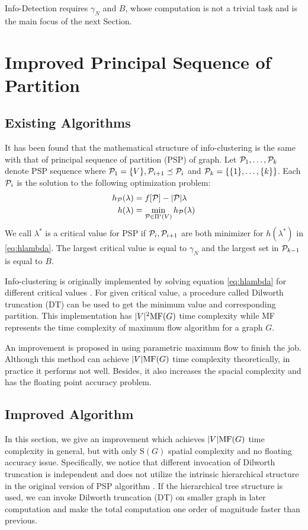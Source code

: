 \documentclass[runningheads]{llncs}
\begin{document}
Info-Detection requires $\gamma_N$ and $B$, whose computation is not a trivial task and is the main focus of the next Section.

\section{Improved Principal Sequence of Partition}\label{sec:Alg}
\subsection{Existing Algorithms}
It has been found that the mathematical structure of info-clustering is the same with that of principal sequence of partition (PSP) of graph. Let $\P_1, \dots, \P_k$ denote PSP sequence where $\P_1 = \{V\}, \P_{i+1} \preceq \P_i$ and $\P_k = \{\{1\},\dots,\{k\}\}$.
Each $\P_i$ is the solution to the following optimization problem:
\begin{align}
h_{\P}(\lambda) &=  f[\P] - \abs{\P} \lambda  \label{eq:hPL}\\
h(\lambda) &= \min_{\P \in \Pi'(V)} h_{\P}(\lambda) \label{eq:hlambda}
\end{align}
We call $\lambda^*$ is a critical value for PSP if $\P_i, \P_{i+1}$ are both minimizer for $h(\lambda^*)$ in \eqref{eq:hlambda}.
The largest critical value is equal to $\gamma_N$ and the largest set in $\P_{k-1}$ is equal to $B$. 

Info-clustering is originally implemented by solving equation \eqref{eq:hlambda} for different critical values \cite{RN3}. For given critical value, a procedure called Dilworth truncation (DT) can be used to get the minimum value and corresponding partition. This implementation has $\abs{V}^2 \textrm{MF}(G)$ time complexity while \textrm{MF} represents the time complexity of maximum flow algorithm for a graph $G$. 

An improvement is proposed in \cite{RN4} using parametric maximum flow to finish the job. Although this method can achieve $\abs{V} \textrm{MF}(G)$ time complexity theoretically, in practice it performs not well. Besides, it also increases the spacial complexity and has the floating point accuracy problem. 

\subsection{Improved Algorithm} 
In this section, we give an improvement which achieves $\abs{V} \textrm{MF}(G)$ time complexity in general, but with only $\textrm{S}(G)$ spatial complexity and no floating accuracy issue. Specifically,
we notice that different invocation of Dilworth truncation is independent and does not utilize the intrinsic hierarchical structure in the original version of PSP algorithm \cite{RN3}. If the hierarchical tree structure is used, we can invoke Dilworth truncation (DT) on smaller graph in later computation and make the total computation one order of magnitude faster than previous.
\end{document}
